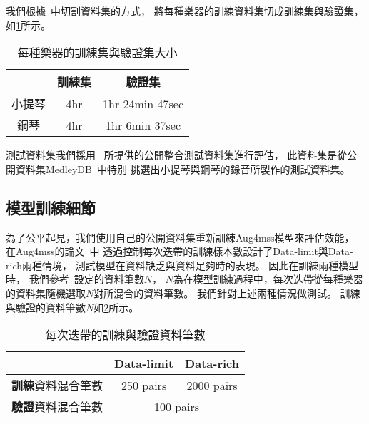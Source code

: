 \documentclass[class=NCU_thesis, crop=false]{standalone}
\begin{document}
我們根據~\cite{Chiu_ChingYu2020MixingSpecific}中切割資料集的方式，
將每種樂器的訓練資料集切成訓練集與驗證集，如\cref{table:table-ours-splited-dataset}所示。
\begin{table}[h]
    \centering
    \caption{每種樂器的訓練集與驗證集大小}
    \label{table:table-ours-splited-dataset}
    \begin{tabular}{|c|c|c|}
        \hline
        \multicolumn{1}{|c|}{} & \multicolumn{1}{|c|}{訓練集} & \multicolumn{1}{|c|}{驗證集} \\
        \hline
        小提琴 & 4hr & 1hr 24min 47sec \\
        \hline
        鋼琴 & 4hr & 1hr 6min 37sec \\
        \hline
    \end{tabular}
\end{table}

測試資料集我們採用~\cite{Chiu_ChingYu2020MixingSpecific}
所提供的公開整合測試資料集進行評估，
此資料集是從公開資料集MedleyDB~\cite{Bittner2014MedleyDB}中特別
挑選出小提琴與鋼琴的錄音所製作的測試資料集。


\subsection{模型訓練細節} \label{training-dataset-processing}
為了公平起見，我們使用自己的公開資料集重新訓練Aug4mss模型來評估效能，
在Aug4mss的論文~\cite{Chiu_ChingYu2020MixingSpecific}中
透過控制每次迭帶的訓練樣本數設計了Data-limit與Data-rich兩種情境，
測試模型在資料缺乏與資料足夠時的表現。
因此在訓練兩種模型時，
我們參考~\cite{Chiu_ChingYu2020MixingSpecific}設定的資料筆數$N$，
$N$為在模型訓練過程中，每次迭帶從每種樂器的資料集隨機選取$N$對所混合的資料筆數。
我們針對上述兩種情況做測試。
訓練與驗證的資料筆數$N$如\cref{table:table-training-dataset-split}所示。
\begin{table}[h]
    \centering
    \caption{每次迭帶的訓練與驗證資料筆數}
    \label{table:table-training-dataset-split}
    \begin{tabular}{|c|c|c|}
        \hline
        \multicolumn{1}{|c|}{} & \multicolumn{1}{|c|}{Data-limit} & \multicolumn{1}{|c|}{Data-rich} \\
        \hline
        \textbf{訓練}資料混合筆數 & 250 pairs & 2000 pairs \\
        \hline
        \textbf{驗證}資料混合筆數 & \multicolumn{2}{|c|}{100 pairs} \\
        \hline
    \end{tabular}
\end{table}
\end{document}

